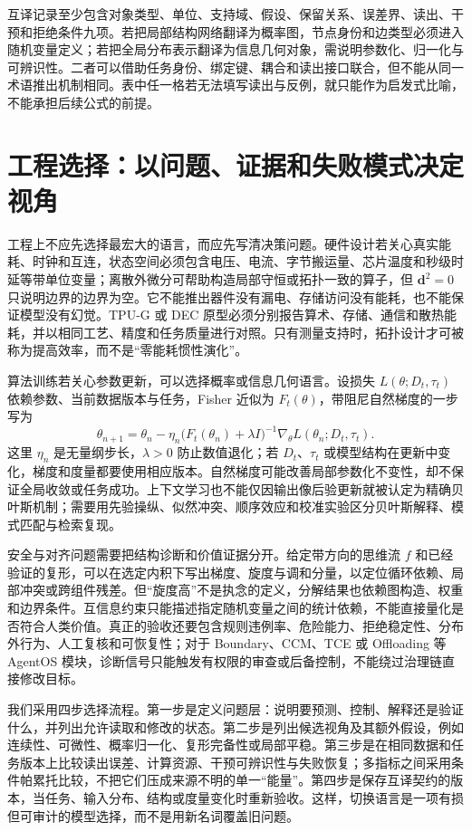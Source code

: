 互译记录至少包含对象类型、单位、支持域、假设、保留关系、误差界、读出、干预和拒绝条件九项。若把局部结构网络翻译为概率图，节点身份和边类型必须进入随机变量定义；若把全局分布表示翻译为信息几何对象，需说明参数化、归一化与可辨识性。二者可以借助任务身份、绑定键、耦合和读出接口联合，但不能从同一术语推出机制相同。表中任一格若无法填写读出与反例，就只能作为启发式比喻，不能承担后续公式的前提。

\section{工程选择：以问题、证据和失败模式决定视角}

工程上不应先选择最宏大的语言，而应先写清决策问题。硬件设计若关心真实能耗、时钟和互连，状态空间必须包含电压、电流、字节搬运量、芯片温度和秒级时延等带单位变量；离散外微分可帮助构造局部守恒或拓扑一致的算子，但 $\mathbf d^2=0$ 只说明边界的边界为空。它不能推出器件没有漏电、存储访问没有能耗，也不能保证模型没有幻觉。TPU-G 或 DEC 原型必须分别报告算术、存储、通信和散热能耗，并以相同工艺、精度和任务质量进行对照。只有测量支持时，拓扑设计才可被称为提高效率，而不是“零能耗惯性演化”。

算法训练若关心参数更新，可以选择概率或信息几何语言。设损失 $L(\theta;D_t,\tau_t)$ 依赖参数、当前数据版本与任务，Fisher 近似为 $F_t(\theta)$，带阻尼自然梯度的一步写为
\[
 \theta_{n+1}=\theta_n-\eta_n\bigl(F_t(\theta_n)+\lambda I\bigr)^{-1}
 \nabla_\theta L(\theta_n;D_t,\tau_t).
\]
这里 $\eta_n$ 是无量纲步长，$\lambda>0$ 防止数值退化；若 $D_t$、$\tau_t$ 或模型结构在更新中变化，梯度和度量都要使用相应版本。自然梯度可能改善局部参数化不变性，却不保证全局收敛或任务成功。上下文学习也不能仅因输出像后验更新就被认定为精确贝叶斯机制；需要用先验操纵、似然冲突、顺序效应和校准实验区分贝叶斯解释、模式匹配与检索复现。

安全与对齐问题需要把结构诊断和价值证据分开。给定带方向的思维流 $f$ 和已经验证的复形，可以在选定内积下写出梯度、旋度与调和分量，以定位循环依赖、局部冲突或跨组件残差。但“旋度高”不是执念的定义，分解结果也依赖图构造、权重和边界条件。互信息约束只能描述指定随机变量之间的统计依赖，不能直接量化是否符合人类价值。真正的验收还要包含规则违例率、危险能力、拒绝稳定性、分布外行为、人工复核和可恢复性；对于 Boundary、CCM、TCE 或 Offloading 等 AgentOS 模块，诊断信号只能触发有权限的审查或后备控制，不能绕过治理链直接修改目标。

我们采用四步选择流程。第一步是定义问题层：说明要预测、控制、解释还是验证什么，并列出允许读取和修改的状态。第二步是列出候选视角及其额外假设，例如连续性、可微性、概率归一化、复形完备性或局部平稳。第三步是在相同数据和任务版本上比较读出误差、计算资源、干预可辨识性与失败恢复；多指标之间采用条件帕累托比较，不把它们压成来源不明的单一“能量”。第四步是保存互译契约的版本，当任务、输入分布、结构或度量变化时重新验收。这样，切换语言是一项有损但可审计的模型选择，而不是用新名词覆盖旧问题。


